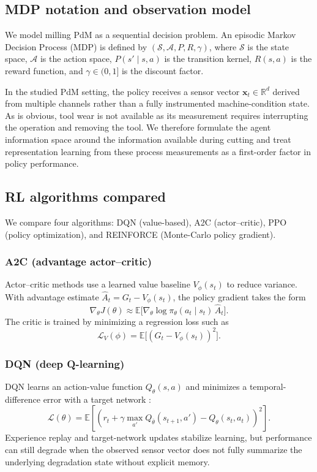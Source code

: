 \documentclass[sn-basic]{sn-jnl} %
\begin{document}
\subsection{MDP notation and observation model}
We model milling PdM as a sequential decision problem. An episodic Markov Decision Process (MDP) is defined by $(\mathcal{S},\mathcal{A},P,R,\gamma)$, where $\mathcal{S}$ is the state space, $\mathcal{A}$ is the action space, $P(s'\mid s,a)$ is the transition kernel, $R(s,a)$ is the reward function, and $\gamma\in(0,1]$ is the discount factor.

In the studied PdM setting, the policy receives a sensor vector $\mathbf{x}_t\in\mathbb{R}^d$ derived from multiple channels rather than a fully instrumented machine-condition state. As is obvious, tool wear is not available as its measurement requires interrupting the operation and removing the tool. We therefore formulate the agent information space around the information available during cutting and treat representation learning from these process measurements as a first-order factor in policy performance.
\label{sec:obs_model}
\subsection{RL algorithms compared}
\label{sec:algos}
We compare four algorithms: DQN (value-based), A2C (actor--critic), PPO (policy optimization), and REINFORCE (Monte-Carlo policy gradient).

\subsubsection{A2C (advantage actor--critic)}
Actor--critic methods use a learned value baseline $V_\phi(s_t)$ to reduce variance. With advantage estimate $\hat{A}_t=G_t-V_\phi(s_t)$, the policy gradient takes the form
\begin{equation}
\nabla_\theta J(\theta) \approx \mathbb{E}\big[\nabla_\theta\log\pi_\theta(a_t\mid s_t)\,\hat{A}_t\big].
\end{equation}
The critic is trained by minimizing a regression loss such as
\begin{equation}
\mathcal{L}_V(\phi)=\mathbb{E}\big[(G_t - V_\phi(s_t))^2\big].
\end{equation}

\subsubsection{DQN (deep Q-learning)}
DQN learns an action-value function $Q_\theta(s,a)$ and minimizes a temporal-difference error with a target network \cite{Mnih2015}:
\begin{equation}
\mathcal{L}(\theta)=\mathbb{E}\left[\left(r_t + \gamma\max_{a'}Q_{\bar\theta}(s_{t+1},a') - Q_\theta(s_t,a_t)\right)^2\right].
\end{equation}
Experience replay and target-network updates stabilize learning, but performance can still degrade when the observed sensor vector does not fully summarize the underlying degradation state without explicit memory.
\end{document}
